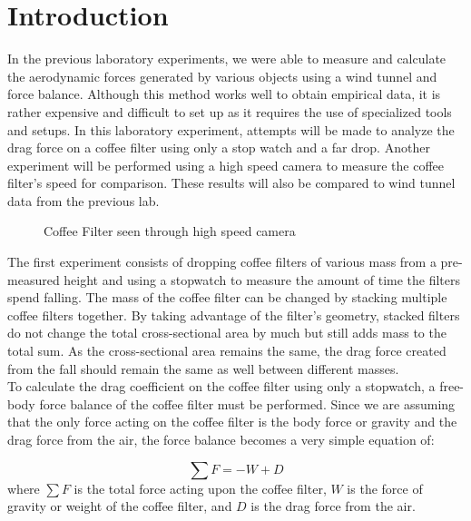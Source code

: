 \documentclass[12pt]{report}
\begin{document}
\newpage
\section*{Introduction}

In the previous laboratory experiments, we were able to measure and calculate the aerodynamic forces generated by various objects using a wind tunnel and force balance. Although this method works well to obtain empirical data, it is rather expensive and difficult to set up as it requires the use of specialized tools and setups. In this laboratory experiment, attempts will be made to analyze the drag force on a coffee filter using only a stop watch and a far drop. Another experiment will be performed using a high speed camera to measure the coffee filter's speed for comparison. These results will also be compared to wind tunnel data from the previous lab.\\

\begin{figure*}[h!]
	\centering
	\caption{Coffee Filter seen through high speed camera}
	\label{fig:cf}
\end{figure*}

\noindent The first experiment consists of dropping coffee filters of various mass from a pre-measured height and using a stopwatch to measure the amount of time the filters spend falling. The mass of the coffee filter can be changed by stacking multiple coffee filters together. By taking advantage of the filter's geometry, stacked filters do not change the total cross-sectional area by much but still adds mass to the total sum. As the cross-sectional area remains the same, the drag force created from the fall should remain the same as well between different masses.\\

\noindent To calculate the drag coefficient on the coffee filter using only a stopwatch, a free-body force balance of the coffee filter must be performed. Since we are assuming that the only force acting on the coffee filter is the body force or gravity and the drag force from the air, the force balance becomes a very simple equation of:

\begin{equation}
	\sum F = -W+D
\end{equation}
where $\sum F$ is the total force acting upon the coffee filter, $W$ is the force of gravity or weight of the coffee filter, and $D$ is the drag force from the air.\\
\end{document}
